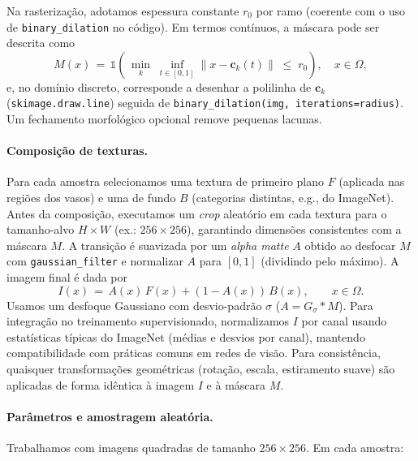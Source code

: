 \documentclass[%
reprint,
nofootinbib,
 amsmath,amssymb,
aps,
superscriptaddress,
showkeys,
longbibliography
]{revtex4-1}
\begin{document}
Na rasterização, adotamos espessura constante $r_0$ por ramo (coerente com o uso de \texttt{binary\_dilation} no código). Em termos contínuos, a máscara pode ser descrita como
\begin{equation}
M(x) \,=\, \mathbb{1}\!\left(\, \min_k\; \inf_{t\in[0,1]} \big\| x - \mathbf{c}_k(t) \big\| \;\le\; r_0 \right), \quad x\in\Omega,
\label{eq:mask}
\end{equation}
e, no domínio discreto, corresponde a desenhar a polilinha de $\mathbf{c}_k$ (\texttt{skimage.draw.line}) seguida de \texttt{binary\_dilation(img, iterations=radius)}. Um fechamento morfológico opcional remove pequenas lacunas.

\paragraph*{Composição de texturas.}
Para cada amostra selecionamos uma textura de primeiro plano $F$ (aplicada nas regiões dos vasos) e uma de fundo $B$ (categorias distintas, e.g., do ImageNet). Antes da composição, executamos um \emph{crop} aleatório em cada textura para o tamanho-alvo $H\times W$ (ex.: $256\times256$), garantindo dimensões consistentes com a máscara $M$. A transição é suavizada por um \emph{alpha matte} $A$ obtido ao desfocar $M$ com \texttt{gaussian\_filter} e normalizar $A$ para $[0,1]$ (dividindo pelo máximo). A imagem final é dada por
\begin{equation}
I(x) \,=\, A(x)\,F(x) + (1-A(x))\,B(x), \qquad x \in \Omega.
\label{eq:compose}
\end{equation}
Usamos um desfoque Gaussiano com desvio-padrão $\sigma$ ($A = G_{\sigma} * M$). Para integração no treinamento supervisionado, normalizamos $I$ por canal usando estatísticas típicas do ImageNet (médias e desvios por canal), mantendo compatibilidade com práticas comuns em redes de visão. Para consistência, quaisquer transformações geométricas (rotação, escala, estiramento suave) são aplicadas de forma idêntica à imagem $I$ e à máscara $M$.

\paragraph*{Parâmetros e amostragem aleatória.}
Trabalhamos com imagens quadradas de tamanho $256\times256$. Em cada amostra:
\end{document}
